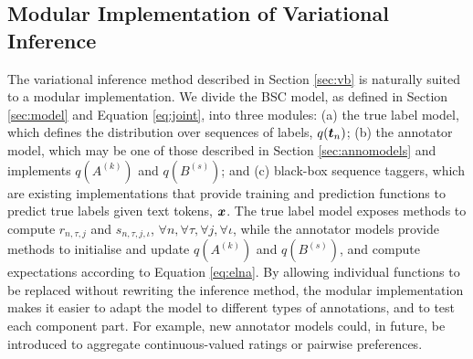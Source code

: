 \subsection{Modular Implementation of Variational Inference} \label{seq:modular}
 
The variational inference method described in Section  \ref{sec:vb}
is naturally suited to a modular implementation. We divide the BSC model, 
as defined in Section \ref{sec:model} and Equation \ref{eq:joint}, into 
three modules: 
(a) the true label model, which defines the distribution over sequences of labels, $q(\boldsymbol t_n)$;
(b) the annotator model, which may be one of those described in Section \ref{sec:annomodels} and implements $q(A^{(k)})$ and $q(B^{(s)})$;
and (c) black-box sequence taggers, which
are existing implementations that provide training and prediction functions
to predict true labels given text tokens, $\boldsymbol x$.
The true label model exposes methods to compute 
$r_{n,\tau,j}$ and $s_{n,\tau,j,\iota}$, $\forall n,\forall \tau,\forall j,\forall \iota$,
while the annotator models provide methods to initialise and update $q(A^{(k)})$ and $q(B^{(s)})$,
and compute expectations according to Equation \ref{eq:elna}.%
By allowing individual functions to be replaced without rewriting the inference
method, the modular implementation makes it easier to adapt the model to different types of annotations,
and to test each component part.
For example, new annotator models could, in future, be introduced to aggregate 
continuous-valued ratings or pairwise preferences.

